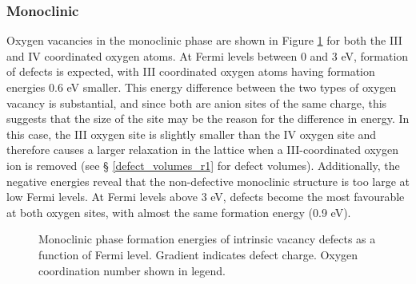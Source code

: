 \subsubsection{Monoclinic}

Oxygen vacancies in the monoclinic phase are shown in Figure \ref{figure:monovacancies} for both the III and IV coordinated oxygen atoms. At Fermi levels between 0 and 3 eV, formation of  defects is expected, with III coordinated oxygen atoms having formation energies 0.6 eV smaller. This energy difference between the two types of oxygen vacancy is substantial, and since both are anion sites of the same charge, this suggests that the size of the site may be the reason for the difference in energy. In this case, the III oxygen site is slightly smaller than the IV oxygen site and therefore causes a larger relaxation in the lattice when a III-coordinated oxygen ion is removed (see § \ref{defect_volumes_r1} for defect volumes). Additionally, the negative energies reveal that the non-defective monoclinic structure is too large at low Fermi levels. At Fermi levels above 3 eV,  defects become the most favourable at both oxygen sites, with almost the same formation energy (0.9 eV). 

\begin{figure}[ht] %
\begin{center}
		\caption{Monoclinic phase formation energies of intrinsic vacancy defects as a function of Fermi level. Gradient indicates defect charge. Oxygen coordination number shown in legend.}
		\label{figure:monovacancies}
	\end{center}
\end{figure}

